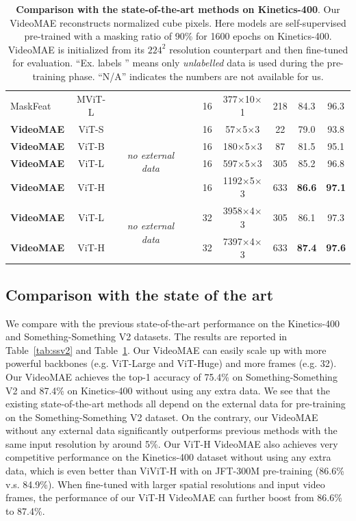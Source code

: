 \documentclass{article}
\newcommand{\xmark}{\ding{55}}%
\def\x{$\times$}
\begin{document}
\begin{table}[t!]
\begin{tabular}{l|c|c|c|c|c|c|c|c}
MaskFeat~\cite{wei2021masked} & MViT-L &  & \xmark & 16  & 377\x10\x1 & 218 & 84.3 & 96.3 \\
\shline\hline
\textbf{VideoMAE} & ViT-S & \multirow{4}{*}{\emph{no external data}} & \xmark & 16 & 57\x5\x3 & 22 & 79.0 & 93.8 \\
\textbf{VideoMAE} & ViT-B &  & \xmark & 16 & 180\x5\x3 & 87 & 81.5 & 95.1 \\
\textbf{VideoMAE} & ViT-L &  & \xmark & 16 & 597\x5\x3 & 305 & 85.2 & 96.8 \\
\textbf{VideoMAE} & ViT-H &  & \xmark & 16 & 1192\x5\x3 & 633 & \textbf{86.6} & \textbf{97.1} \\
\hline
\textbf{VideoMAE{\scriptsize\textuparrow320}} & ViT-L & \multirow{2}{*}{\emph{no external data}} & \xmark & 32 & 3958\x4\x3 & 305 & 86.1 & 97.3 \\
\textbf{VideoMAE{\scriptsize\textuparrow320}} & ViT-H &  & \xmark & 32 & 7397\x4\x3 & 633 & \textbf{87.4} & \textbf{97.6} \\
\end{tabular}
\vspace{-0.5mm}
\caption{\textbf{Comparison with the state-of-the-art methods on Kinetics-400}. Our VideoMAE reconstructs normalized cube pixels. Here models are self-supervised pre-trained with a masking ratio of 90\% for 1600 epochs on Kinetics-400. VideoMAE{\scriptsize{}} is initialized from its $224^2$ resolution counterpart and then fine-tuned for evaluation. ``Ex. labels \xmark '' means only \textit{unlabelled} data is used during the pre-training phase. ``N/A'' indicates the numbers are not available for us. }
\vspace{-1em}
\label{tab:k400}
\end{table}

\subsection{Comparison with the state of the art}
We compare with the previous state-of-the-art performance on the Kinetics-400 and Something-Something V2 datasets. The results are reported in Table~\ref{tab:ssv2} and Table~\ref{tab:k400}. Our VideoMAE can easily scale up with more powerful backbones (e.g. ViT-Large and ViT-Huge) and more frames (e.g. 32). Our VideoMAE achieves the top-1 accuracy of 75.4\% on Something-Something V2 and 87.4\% on Kinetics-400 without using any extra data. We see that the existing state-of-the-art methods all depend on the external data for pre-training on the Something-Something V2 dataset. On the contrary, our VideoMAE without any external data significantly outperforms previous methods with the same input resolution by around 5\%. Our ViT-H VideoMAE also achieves very competitive performance on the Kinetics-400 dataset without using any extra data, which is even better than ViViT-H with on JFT-300M pre-training (86.6\% v.s. 84.9\%). When fine-tuned with larger spatial resolutions and input video frames, the performance of our ViT-H VideoMAE can further boost from 86.6\% to 87.4\%.
\end{document}
